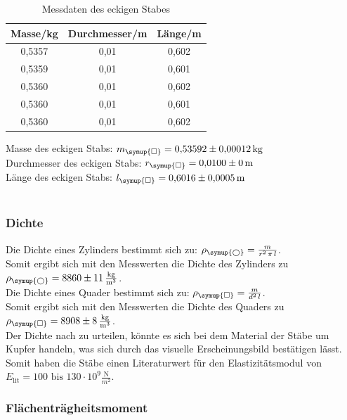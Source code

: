   \begin{table}
    \centering
    \caption{Messdaten des eckigen Stabes}
    \label{tab:eckiger_Stab}
    \begin{tabular}{c c c}
      \toprule
      Masse/kg & Durchmesser/m & Länge/m \\
      \midrule
      0,5357 & 0,01 & 0,602 \\
      0,5359 & 0,01 & 0,601 \\
      0,5360 & 0,01 & 0,602 \\
      0,5360 & 0,01 & 0,601 \\
      0,5360 & 0,01 & 0,602 \\
      \bottomrule
    \end{tabular}
  \end{table}
  Masse des eckigen Stabs: $m_{\symup{\square}} = 0{,}53592 \pm 0{,}00012 \, \mathrm{kg}$\\
  Durchmesser des eckigen Stabs: $r_{\symup{\square}} = 0{,}0100 \pm 0 \, \mathrm{m}$\\
  Länge des eckigen Stabs: $l_{\symup{\square}} = 0{,}6016 \pm 0{,}0005 \, \mathrm{m}$\\
  \\
  \subsubsection{Dichte}
    Die Dichte eines Zylinders bestimmt sich zu: $\rho_{\symup{\bigcirc}} = \frac{m}{r^2 \, \pi \, l}$.\\
    Somit ergibt sich mit den Messwerten die Dichte des Zylinders zu $\rho_{\symup{\bigcirc}} = 8860 \pm 11 \, \frac{\mathrm{kg}}{\mathrm{m^3}}$.\\

    Die Dichte eines Quader bestimmt sich zu: $\rho_{\symup{\square}} = \frac{m}{d^2 \, l}$.\\
    Somit ergibt sich mit den Messwerten die Dichte des Quaders zu $\rho_{\symup{\square}} = 8908 \pm 8 \, \frac{\mathrm{kg}}{\mathrm{m^3}}$.\\

    Der Dichte nach zu urteilen, könnte es sich bei dem Material der Stäbe um Kupfer handeln, was sich durch das visuelle
    Erscheinungsbild bestätigen lässt. Somit haben die Stäbe einen Literaturwert für den Elastizitätsmodul von $E_{\mathrm{lit}} = 100 \text{ bis } 130 \cdot \mathrm{10^{9}} \frac{\mathrm{N}}{m^2}$\cite{Kupfer}.
  \subsubsection{Flächenträgheitsmoment}

